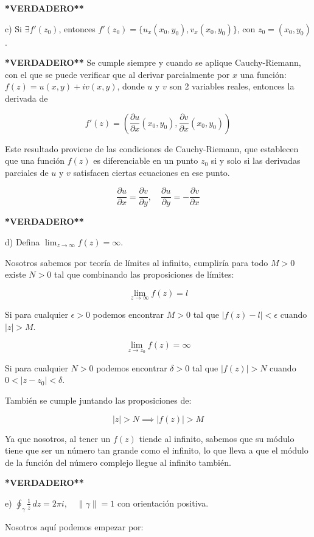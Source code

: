 \documentclass[a4paper,12pt]{article}
\begin{document}
{\bf **VERDADERO**}

c) Si \(\exists f'(z_0)\), entonces \(f'(z_0) = \{u_x(x_0, y_0), v_x(x_0, y_0)\}\), con \(z_0 = (x_0, y_0)\).

{\bf **VERDADERO**}
Se cumple siempre y cuando se aplique Cauchy-Riemann, con el que se puede verificar que al derivar parcialmente por \(x\) una función: \(f(z) = u(x, y) + iv(x, y)\), donde \(u\) y \(v\) son 2 variables reales, entonces la derivada de

\[
f'(z) = \left(\frac{\partial u}{\partial x}(x_0, y_0), \frac{\partial v}{\partial x}(x_0, y_0)\right)
\]

Este resultado proviene de las condiciones de Cauchy-Riemann, que establecen que una función \(f(z)\) es diferenciable en un punto \(z_0\) si y solo si las derivadas parciales de \(u\) y \(v\) satisfacen ciertas ecuaciones en ese punto.

\[
\frac{\partial u}{\partial x} = \frac{\partial v}{\partial y}, \quad \frac{\partial u}{\partial y} = -\frac{\partial v}{\partial x}
\]

{\bf **VERDADERO**}

d) Defina \(\lim_{z \to \infty} f(z) = \infty\).

Nosotros sabemos por teoría de límites al infinito, cumpliría para todo \(M > 0\) existe \(N > 0\) tal que combinando las proposiciones de límites:

\[
\lim_{z \to \infty} f(z) = l
\]

Si para cualquier \(\epsilon > 0\) podemos encontrar \(M > 0\) tal que \(|f(z) - l| < \epsilon\) cuando \(|z| > M\).

\[
\lim_{z \to z_0} f(z) = \infty
\]

Si para cualquier \(N > 0\) podemos encontrar \(\delta > 0\) tal que \(|f(z)| > N\) cuando \(0 < |z - z_0| < \delta\).

También se cumple juntando las proposiciones de:

\[
|z| > N \implies |f(z)| > M
\]

Ya que nosotros, al tener un \(f(z)\) tiende al infinito, sabemos que su módulo tiene que ser un número tan grande como el infinito, lo que lleva a que el módulo de la función del número complejo llegue al infinito también.

{\bf **VERDADERO**}

e) \(\oint_\gamma \frac{1}{z} \, dz = 2\pi i, \quad \|\gamma\| = 1\) con orientación positiva.

Nosotros aquí podemos empezar por:
\end{document}
